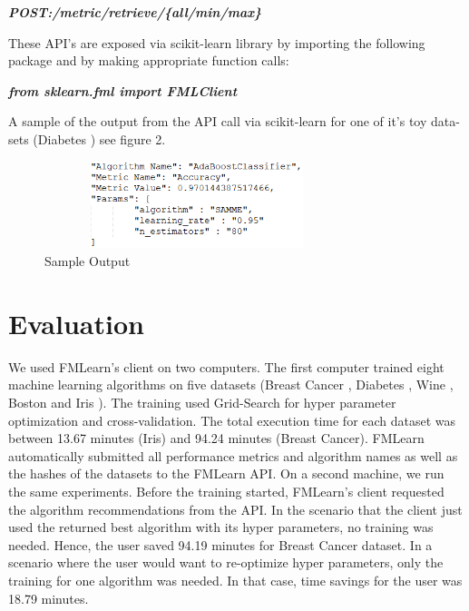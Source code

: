 \documentclass{article}
\begin{document}
\textbf{\textit{POST:/metric/retrieve/\{all/min/max\}}}

These API’s are exposed via scikit-learn library by importing the following package and by making appropriate function calls:

\textbf{\textit{from sklearn.fml import FMLClient}}

A sample of the output from the API call via scikit-learn for one of it's toy data-sets (Diabetes \cite{bradley-et-al}) see figure 2.
\begin{figure}[ht]
    \centering
    \includegraphics[width=3.5in, height=1in]{sample-output.png}
    \caption{Sample Output}
    \label{sample-output}
\end{figure}


\section{Evaluation}
 We used FMLearn's client on two computers. The first computer trained eight machine learning algorithms on five datasets (Breast Cancer \cite{brendan-et-al}, Diabetes \cite{bradley-et-al}, Wine \cite{lichman:m}, Boston \cite{harrison-et-al} and Iris \cite{fisher:r}). The training used Grid-Search for hyper parameter optimization and cross-validation. The total execution time for each dataset was between 13.67 minutes (Iris) and 94.24 minutes (Breast Cancer). FMLearn automatically submitted all performance metrics and algorithm names as well as the hashes of the datasets to the FMLearn API. On a second machine, we run the same experiments. Before the training started, FMLearn's client requested the algorithm recommendations from the API. In the scenario that the client just used the returned best algorithm with its hyper parameters, no training was needed. Hence, the user saved 94.19 minutes for Breast Cancer dataset. In a scenario where the user would want to re-optimize hyper parameters, only the training for one algorithm was needed. In that case, time savings for the user was 18.79 minutes.
 
\end{document}
